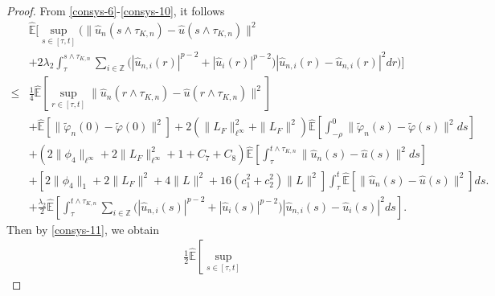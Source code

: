 \documentclass[10pt,a4paper]{amsart}
\begin{document}
\begin{proof}
  From \eqref{consys-6}-\eqref{consys-10}, it follows
  \begin{align}\label{consys-11}
         & \widehat{\mathbb{E}}
              \Big[ \sup_{s \in [\tau, t]}
                    \Big( \|\hat{u}_n(s \wedge \tau_{K,n}) - \hat{u}(s \wedge \tau_{K,n})\|^2 \nonumber\\
         &          +  2\lambda_2 \int_{\tau}^{s \wedge \tau_{K,n}}
                         \sum_{i \in \mathbb{Z}}
                            \Big( |\hat{u}_{n,i}(r)|^{p-2} + |\hat{u}_{i}(r)|^{p-2} \Big) |\hat{u}_{n,i}(r) - \hat{u}_{n,i}(r)|^2 dr \Big)
              \Big]  \nonumber\\
    \le & \frac{1}{4} \widehat{\mathbb{E}}
              \left[ \sup_{r \in [\tau, t]}
                          \| \hat{u}_n(r \wedge \tau_{K,n}) - \hat{u}(r \wedge \tau_{K,n}) \|^2
              \right]  \nonumber\\
         & + \widehat{\mathbb{E}}[\| \widetilde{\varphi}_n(0) - \widetilde{\varphi}(0)\|^2]
           + 2 \left( \|L_F\|_{\ell^\infty}^2 + \|L_F\|^2 \right)
               \widehat{\mathbb{E}}
                  \left[ \int_{-\rho}^{0}
                            \|{\widetilde{\varphi}}_n(s) - \widetilde{\varphi}(s)\|^2 ds
                  \right]  \nonumber\\
         & + \left( 2 \|\phi_4\|_{\ell^\infty}
                    + 2 \|L_F\|_{\ell^\infty}^2 + 1
                    +C_7
                    +C_8 
             \right)
             \widehat{\mathbb{E}}
                      \left[ \int_{\tau}^{t \wedge \tau_{K,n}}
                                \|\hat{u}_{n}(s) - \hat{u}(s)\|^2 ds
                      \right]  \nonumber\\
         & + \left[ 2 \|\phi_4\|_1
                    + 2 \|L_F\|^2
                    + 4 \| L \|^2 + 16 \left( c_1^2 + c_2^2 \right) \| L \|^2
             \right]
             \int_{\tau}^{t} \widehat{\mathbb{E}} [\|\hat{u}_{n}(s) - \hat{u}(s)\|^2] ds.  \nonumber\\
         & + \frac{\lambda_2}{2} \widehat{\mathbb{E}}
                \left[\int_{\tau}^{t \wedge \tau_{K,n}} \sum_{i \in \mathbb{Z}}
                         \Big( |\hat{u}_{n,i}(s)|^{p-2} + |\hat{u}_i(s)|^{p-2} \Big)
                         |\hat{u}_{n,i}(s) - \hat{u}_i(s)|^2 ds
                \right].
  \end{align}
  Then by \eqref{consys-11}, we obtain
  \begin{align}\label{consys-12}
         & \frac{1}{2} \widehat{\mathbb{E}}
              \left[ \sup_{s \in [\tau, t]}

\end{align}
\end{proof}
\end{document}
